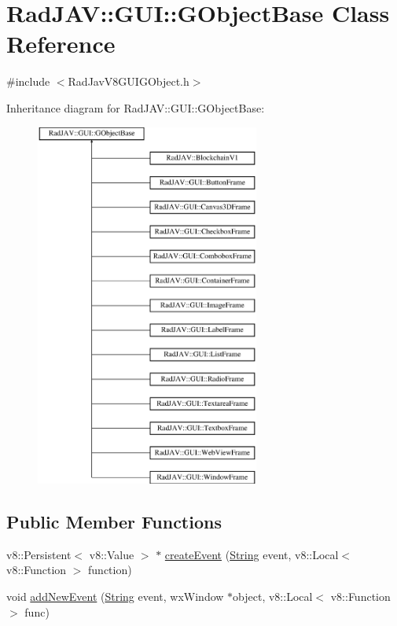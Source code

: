\hypertarget{class_rad_j_a_v_1_1_g_u_i_1_1_g_object_base}{}\section{Rad\+J\+AV\+:\+:G\+UI\+:\+:G\+Object\+Base Class Reference}
\label{class_rad_j_a_v_1_1_g_u_i_1_1_g_object_base}


{\ttfamily \#include $<$Rad\+Jav\+V8\+G\+U\+I\+G\+Object.\+h$>$}

Inheritance diagram for Rad\+J\+AV\+:\+:G\+UI\+:\+:G\+Object\+Base\+:\begin{figure}[H]
\begin{center}
\leavevmode
\includegraphics[height=12.000000cm]{class_rad_j_a_v_1_1_g_u_i_1_1_g_object_base}
\end{center}
\end{figure}
\subsection*{Public Member Functions}
\begin{DoxyCompactItemize}
\item 
v8\+::\+Persistent$<$ v8\+::\+Value $>$ $\ast$ \mbox{\hyperlink{class_rad_j_a_v_1_1_g_u_i_1_1_g_object_base_a2d1f371d8f289dfdd262ec447c83a5a9}{create\+Event}} (\mbox{\hyperlink{class_rad_j_a_v_1_1_string}{String}} event, v8\+::\+Local$<$ v8\+::\+Function $>$ function)
\item 
void \mbox{\hyperlink{class_rad_j_a_v_1_1_g_u_i_1_1_g_object_base_a1a7638a8c8ce513a4688a6907f02b6ca}{add\+New\+Event}} (\mbox{\hyperlink{class_rad_j_a_v_1_1_string}{String}} event, wx\+Window $\ast$object, v8\+::\+Local$<$ v8\+::\+Function $>$ func)
\end{DoxyCompactItemize}
